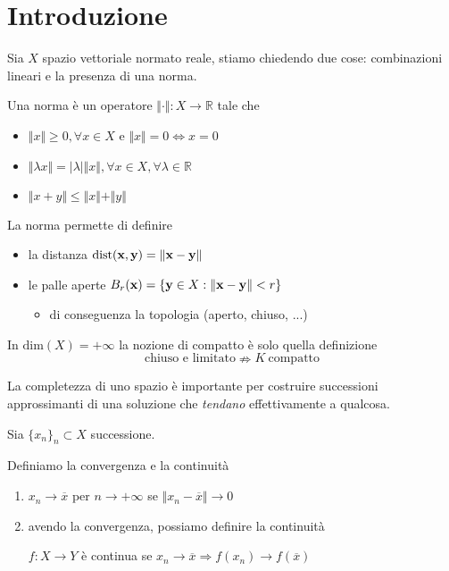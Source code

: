 \chapter{Introduzione}

Sia $X$ spazio vettoriale normato reale, stiamo chiedendo due cose: combinazioni lineari e la presenza di una norma.

\begin{definition}
    [Norma] Una norma è un operatore $\Vert \cdotp \Vert :X\rightarrow \mathbb{R}$ tale che
    \begin{itemize}
        \item $\Vert x\Vert \geq 0,\forall x\in X$ e $\Vert x\Vert =0\Leftrightarrow x=0$
        \item $\Vert \lambda x\Vert =| \lambda | \Vert x\Vert,\forall x\in X,\forall \lambda \in \mathbb{R}$
        \item $\Vert x+y\Vert \leq \Vert x\Vert +\Vert y\Vert $
    \end{itemize}
\end{definition}

La norma permette di definire
\begin{itemize}
    \item la distanza $\text{dist}(\mathbf{x},\mathbf{y}) =\Vert \mathbf{x}-\mathbf{y}\Vert $
    \item le palle aperte $B_{r}(\mathbf{x}) =\{\mathbf{y}\in X:\Vert \mathbf{x}-\mathbf{y}\Vert < r\}$
          \begin{itemize}
              \item di conseguenza la topologia (aperto, chiuso, ...)
          \end{itemize}
\end{itemize}
\begin{nb}
    In $\mathrm{dim}(X) =+\infty $ la nozione di compatto è solo quella definizione
    \begin{equation*}
        \text{chiuso e limitato} \nRightarrow K\ \text{compatto}
    \end{equation*}
\end{nb}
La completezza di uno spazio è importante per costruire successioni approssimanti di una soluzione che \textit{tendano} effettivamente a qualcosa.

Sia $\{x_{n}\}_{n} \subset X$ successione.
\begin{definition}
    Definiamo la convergenza e la continuità
    \begin{enumerate}
        \item $x_{n}\rightarrow \overline{x}$ per $n\rightarrow +\infty $ se $\Vert x_{n} -\overline{x}\Vert \rightarrow 0$
        \item avendo la convergenza, possiamo definire la continuità

              $f:X\rightarrow Y$ è continua se $x_{n}\rightarrow \overline{x} \Rightarrow f(x_{n})\rightarrow f(\overline{x})$
    \end{enumerate}
\end{definition}

